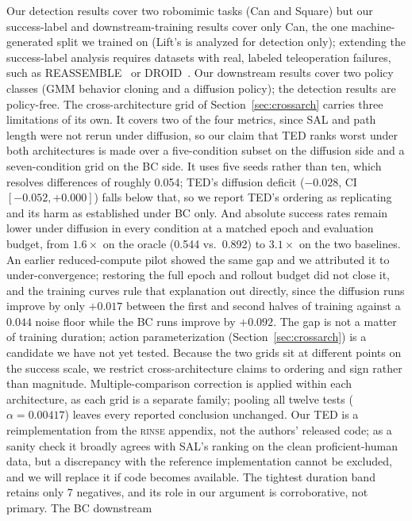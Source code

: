 \documentclass{article}
\newcommand{\rinse}{\textsc{rinse}}
\begin{document}
Our detection results cover two robomimic tasks (Can and Square) but our
success-label and downstream-training results cover only Can, the one machine-generated split we trained on (Lift's is analyzed for detection only); extending the
success-label analysis requires datasets with real, labeled teleoperation
failures, such as \mbox{REASSEMBLE}~\citep{reassemble} or
DROID~\citep{droid}. Our downstream results cover two policy classes (GMM behavior
cloning and a diffusion policy); the detection results are policy-free.
The cross-architecture grid of Section~\ref{sec:crossarch} carries three
limitations of its own. It covers two of the four metrics, since SAL and
path length were not rerun under diffusion, so our claim that TED ranks
worst under both architectures is made over a five-condition subset on the
diffusion side and a seven-condition grid on the BC side. It uses five seeds
rather than ten, which resolves differences of roughly 0.054; TED's
diffusion deficit ($-0.028$, CI $[-0.052, +0.000]$) falls below that, so we
report TED's ordering as replicating and its harm as established under BC
only. And absolute success rates remain lower under diffusion in every
condition at a matched epoch and evaluation budget, from $1.6\times$ on the
oracle (0.544 vs.\ 0.892) to $3.1\times$ on the two baselines. An earlier
reduced-compute pilot showed the same gap and we attributed it to
under-convergence; restoring the full epoch and rollout budget did not close
it, and the training curves rule that explanation out directly, since the
diffusion runs improve by only $+0.017$ between the first and second halves
of training against a $0.044$ noise floor while the BC runs improve by
$+0.092$. The gap is not a matter of training duration; action
parameterization (Section~\ref{sec:crossarch}) is a candidate we have not
yet tested. Because the two grids sit at different points on
the success scale, we restrict cross-architecture claims to ordering and
sign rather than magnitude. Multiple-comparison correction is applied within
each architecture, as each grid is a separate family; pooling all twelve
tests ($\alpha = 0.00417$) leaves every reported conclusion unchanged.
Our TED is a reimplementation from the \rinse{} appendix, not the authors'
released code; as a sanity check it broadly agrees with SAL's ranking on the
clean proficient-human data, but a discrepancy with the reference
implementation cannot be excluded, and we will replace it if code becomes
available. The tightest duration band retains only 7 negatives, and its
role in our argument is corroborative, not primary. The BC downstream
\end{document}
